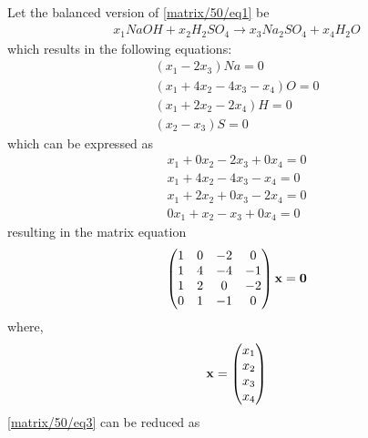 Let the balanced version of \eqref{matrix/50/eq1} be
\begin{multline}
   x_{1}NaOH + x_{2}H_2SO_4 \xrightarrow{} 
   x_{3}Na_2SO_4 + x_{4}H_2O \label{matrix/50/eq2}
\end{multline}
which results in the following equations:
\begin{align}
    (x_{1}-2x_{3}) Na= 0\\
    (x_{1}+4x_{2}-4x_{3}-x_{4}) O= 0\\
    (x_{1}+2x_{2}-2x_{4}) H=0\\
    (x_{2}-x_{3}) S= 0
\end{align}
which can be expressed as
\begin{align}
    x_{1}+ 0 x_{2}- 2x_{3}+ 0 x_{4} = 0\\
    x_{1}+ 4x_{2}- 4x_{3}- x_{4} = 0\\
    x_{1}+ 2x_{2}+ 0 x_{3}- 2x_{4} = 0\\
    0 x_{1}+ x_{2}- x_{3}+ 0 x_{4} = 0
\end{align}
resulting in the matrix equation
\begin{align}
    \begin{pmatrix} 1 & 0 & -2 & 0\\
           1 & 4 & -4 & -1\\
           1 & 2 & 0 & -2\\
           0 & 1 & -1 & 0\end{pmatrix}\mathbf{x}
           =\mathbf{0}    \label{matrix/50/eq3}
\end{align}
where,
\begin{align}
   \mathbf{x}= \begin{pmatrix} x_{1}\\x_{2}\\x_{3}\\x_{4}\end{pmatrix}
\end{align}
\eqref{matrix/50/eq3} can be reduced as
